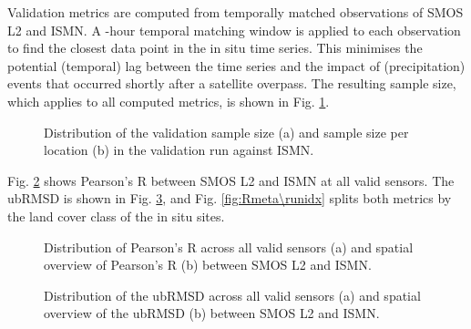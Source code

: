 \noindent Validation metrics are computed from temporally matched observations of \ac{SMOS} \ac{L2} and \ac{ISMN}.
A -hour temporal matching window is applied to each  observation to find the closest data point in the in situ time series.
This minimises the potential (temporal) lag between the time series and the impact of (precipitation) events that occurred shortly after a satellite overpass.
The resulting sample size, which applies to all computed metrics, is shown in Fig. \ref{fig:nobs\runidx}.

\begin{figure}[ht!]
\centering
\begin{minipage}[c]{0.34\textwidth}
    \centering
    \subcaption{} %
\end{minipage}%
\hfill
\begin{minipage}[c]{0.64\textwidth}
    \centering
    \subcaption{} %
\end{minipage}
\caption{Distribution of the validation sample size (a) and sample size per location (b) in the validation run against \ac{ISMN}.}
\label{fig:nobs\runidx}
\end{figure}

\noindent Fig. \ref{fig:Rbox\runidx} shows Pearson's R between \ac{SMOS} \ac{L2} and \ac{ISMN} at all valid sensors.
The \ac{ubRMSD} is shown in Fig. \ref{fig:urmsd\runidx}, and Fig. \ref{fig:Rmeta\runidx} splits both metrics by the land cover class of the in situ sites.

\begin{figure}[ht!]
\centering
\begin{minipage}[c]{0.34\textwidth}
    \centering
    \subcaption{} %
\end{minipage}%
\hfill
\begin{minipage}[c]{0.64\textwidth}
    \centering
    \subcaption{} %
\end{minipage}
\caption{Distribution of Pearson's R across all valid sensors (a) and spatial overview of Pearson's R (b) between \ac{SMOS} \ac{L2} and \ac{ISMN}.}
\label{fig:Rbox\runidx}
\end{figure}

\begin{figure}[ht!]
\centering
\begin{minipage}[c]{0.34\textwidth}
    \centering
    \subcaption{} %
\end{minipage}%
\hfill
\begin{minipage}[c]{0.64\textwidth}
    \centering
    \subcaption{} %
\end{minipage}
\caption{Distribution of the \ac{ubRMSD} across all valid sensors (a) and spatial overview of the \ac{ubRMSD} (b) between \ac{SMOS} \ac{L2} and \ac{ISMN}.}
\label{fig:urmsd\runidx}
\end{figure}

